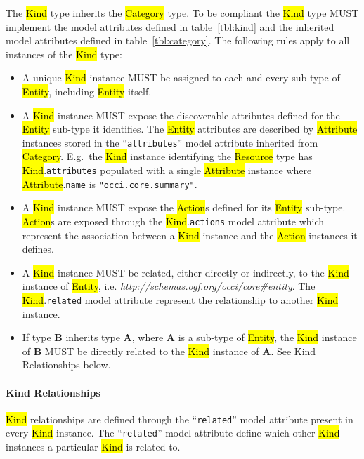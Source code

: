 \documentclass[10pt,a4paper]{article}
\begin{document}
The \hl{Kind} type inherits the \hl{Category} type. To be compliant
the \hl{Kind} type MUST implement the model attributes defined in
table~\ref{tbl:kind} and the inherited model attributes defined in
table~\ref{tbl:category}. The following rules apply to all instances
of the \hl{Kind} type:
%
\begin{itemize}
  \item A unique \hl{Kind} instance MUST be assigned to each and every
    sub-type of \hl{Entity}, including \hl{Entity} itself.

  \item A \hl{Kind} instance MUST expose the discoverable attributes defined for
    the \hl{Entity} sub-type it identifies. The \hl{Entity} attributes are
    described by \hl{Attribute} instances stored in the ``{\tt attributes}''
    model attribute inherited from
    \hl{Category}. E.g.~the \hl{Kind} instance identifying the
    \hl{Resource} type has \hl{Kind}.{\tt attributes} populated with a single \hl{Attribute}
    instance where \hl{Attribute}.{\tt name} is {\tt "occi.core.summary"}.

  \item A \hl{Kind} instance MUST expose the \hl{Action}s defined for
    its \hl{Entity} sub-type. \hl{Action}s are exposed through the
    \hl{Kind}.{\tt actions} model attribute which represent the association
    between a \hl{Kind} instance and the \hl{Action} instances it defines.

  \item A \hl{Kind} instance MUST be related, either directly or
    indirectly, to the \hl{Kind} instance of \hl{Entity},
    i.e. \textit{http://schemas.ogf.org/occi/core\#entity}.  The
    \hl{Kind}.{\tt related} model attribute represent the relationship to
    another \hl{Kind} instance.

  \item If type {\bf B} inherits type {\bf A}, where {\bf A} is a
    sub-type of \hl{Entity}, the \hl{Kind} instance of {\bf B} MUST be
    directly related to the \hl{Kind} instance of {\bf A}. See Kind
    Relationships below.
\end{itemize}

\paragraph*{Kind Relationships}
\hl{Kind} relationships are defined through the ``{\tt related}''
model attribute present in every \hl{Kind} instance. The ``{\tt related}''
model attribute define which other \hl{Kind} instances a particular
\hl{Kind} is related to.
\end{document}
